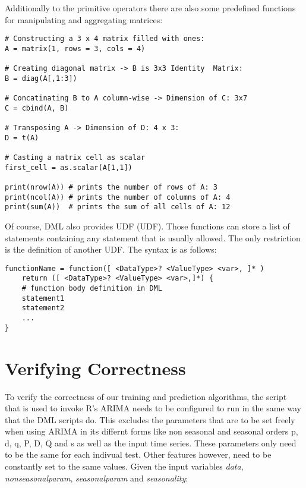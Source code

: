 Additionally to the primitive operators there are also some predefined functions for manipulating and aggregating matrices:

\begin{lstlisting}[caption={Example for matrix manipulation and aggregation},captionpos=b]
# Constructing a 3 x 4 matrix filled with ones:
A = matrix(1, rows = 3, cols = 4) 

# Creating diagonal matrix -> B is 3x3 Identity  Matrix:
B = diag(A[,1:3])					

# Concatinating B to A column-wise -> Dimension of C: 3x7
C = cbind(A, B)						

# Transposing A -> Dimension of D: 4 x 3:
D = t(A)							

# Casting a matrix cell as scalar
first_cell = as.scalar(A[1,1])		

print(nrow(A)) # prints the number of rows of A: 3
print(ncol(A)) # prints the number of columns of A: 4
print(sum(A))  # prints the sum of all cells of A: 12
\end{lstlisting}

Of course, \acs{DML} also provides \acl{UDF} (\acs{UDF}). Those functions can store a list of statements containing any statement that is usually allowed. The only restriction is the definition of another \acs{UDF}. The syntax is as follows:

\begin{lstlisting}[caption={\acl{UDF} syntax},captionpos=b]
functionName = function([ <DataType>? <ValueType> <var>, ]* )
    return ([ <DataType>? <ValueType> <var>,]*) {
    # function body definition in DML
    statement1
    statement2
    ...
}
\end{lstlisting}

\section{Verifying Correctness}

To verify the correctness of our training and prediction algorithms, the script that is used to invoke R's ARIMA needs to be configured to run in the same way that the \acs{DML} scripts do. 
This excludes the parameters that are to be set freely when using ARIMA in its differnt forms like non seasonal and seasonal orders p, d, q, P, D, Q and s as well as the input time series. These parameters only need to be the same for each indivual test.
Other features however, need to be constantly set to the same values. Given the input variables \textit{data}, \textit{nonseasonalparam}, \textit{seasonalparam} and \textit{seasonality}:

